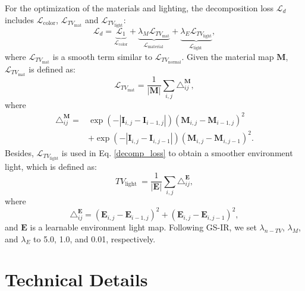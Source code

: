 \documentclass{article} %
\begin{document}
For the optimization of the materials and lighting, the decomposition loss $\mathcal{L}_d$ includes $\mathcal{L}_{\text {color}}$, $\mathcal{L}_{TV_\text{mat}}$ and $\mathcal{L}_{TV_\text{light}}$:
\begin{equation} \label{decomp_loss} \mathcal{L}_d=\underbrace{\mathcal{L}_1}_{\mathcal{L}_{\text {color}}}+\underbrace{\lambda_M \mathcal{L}_{TV_\text{mat}}}_{\mathcal{L}_{\text {material }}}+\underbrace{\lambda_E \mathcal{L}_{TV_\text{light}}}_{\mathcal{L}_{\text {light }}},
\end{equation}
where $\mathcal{L}_{TV_\text{mat}}$ is a smooth term similar to $\mathcal{L}_{TV_\text{normal}}$. Given the material map $\boldsymbol{M}$, $\mathcal{L}_{TV_\text{mat}}$ is defined as:
\begin{equation}
    \mathcal{L}_{TV_\text{mat}} =\frac{1}{|\boldsymbol{M}|} \sum_{i, j} \triangle_{i j}^{\bm{M}},
\end{equation}
where
\begin{equation}
    \begin{aligned}
\triangle_{i j}^{\bm{M}}= & \exp \left(-\left|\boldsymbol{I}_{i, j}-\boldsymbol{I}_{i-1, j}\right|\right)\left(\boldsymbol{M}_{i, j}-\boldsymbol{M}_{i-1, j}\right)^2 \\
&+\exp \left(-\left|\boldsymbol{I}_{i, j}-\boldsymbol{I}_{i, j-1}\right|\right)\left(\boldsymbol{M}_{i, j}-\boldsymbol{M}_{i, j-1}\right)^2.
\end{aligned}
\end{equation}
Besides, $\mathcal{L}_{TV_\text{light}}$ is used in Eq. \ref{decomp_loss} to obtain a smoother environment light, which is defined as: 
\begin{equation}
    T V_{\text {light }}=\frac{1}{|\boldsymbol{E}|} \sum_{i, j} \triangle_{i j}^{\boldsymbol{E}},
\end{equation}
where
\begin{equation}
 \triangle_{i j}^{\boldsymbol{E}}=\left(\boldsymbol{E}_{i, j}-\boldsymbol{E}_{i-1, j}\right)^2+\left(\boldsymbol{E}_{i, j}-\boldsymbol{E}_{i, j-1}\right)^2,
\end{equation}
and $\bm{E}$ is a learnable environment light map. Following GS-IR, we set $\lambda_{n-T V}$, $\lambda_M$, and $\lambda_E$ to 5.0, 1.0, and 0.01, respectively.



\section{Technical Details}\label{appendix_tech}
\end{document}
